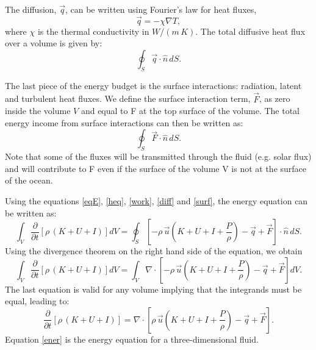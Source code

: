 The diffusion, $\vec{q}$, can be written using Fourier's law for heat fluxes,
\begin{equation}
\vec{q} = - \chi \nabla T,
\end{equation}
where $\chi$ is the thermal conductivity in $W/(m \, K)$. The total diffusive heat flux over a volume is given by:
\begin{equation}\label{diff}
\oint_S \vec{q}\cdot \hat{n}\, dS.
\end{equation}

The last piece of the energy budget is the surface interactions: radiation, latent and turbulent heat fluxes. We define the surface interaction term, $\vec{F}$, as zero inside the volume $V$ and equal to F at the top surface of the volume. The total energy income from surface interactions can then be written as:
\begin{equation}\label{surf}
\oint_S \vec{F} \cdot \hat{n} \,dS.
\end{equation}
Note that some of the fluxes will be transmitted through the fluid (e.g. solar flux) and will contribute to F even if the surface of the volume V is not at the surface of the ocean.

Using the equations \ref{eqE}, \ref{heq}, \ref{work}, \ref{diff} and \ref{surf}, the energy equation can be written as:
\begin{equation}
\int_V \frac{\partial}{\partial t} \left[ \rho \, (K+U+I) \right]  dV = \oint_S \left[{-\rho \, \vec{u} (K+U+I+\frac{P}{\rho}) - \vec{q} + \vec{F} } \right] \cdot \hat{n}\, dS.
\end{equation}
Using the divergence theorem on the right hand side of the equation, we obtain
\begin{equation}
\int_V \frac{\partial}{\partial t} \left[ \rho \, (K+U+I) \right]  dV = \int_V \nabla \cdot \left[{-\rho \, \vec{u} (K+U+I+\frac{P}{\rho}) - \vec{q} + \vec{F}  } \right] dV.
\end{equation}
The last equation is valid for any volume implying that the integrands must be equal, leading to:
\begin{equation}\label{ener}
\frac{\partial}{\partial t} \left[ \rho \, (K+U+I) \right] = \nabla \cdot \left[{\rho \, \vec{u} (K+U+I+\frac{P}{\rho}) - \vec{q} + \vec{F}  } \right].
\end{equation}
Equation \ref{ener} is the energy equation for a three-dimensional fluid.

